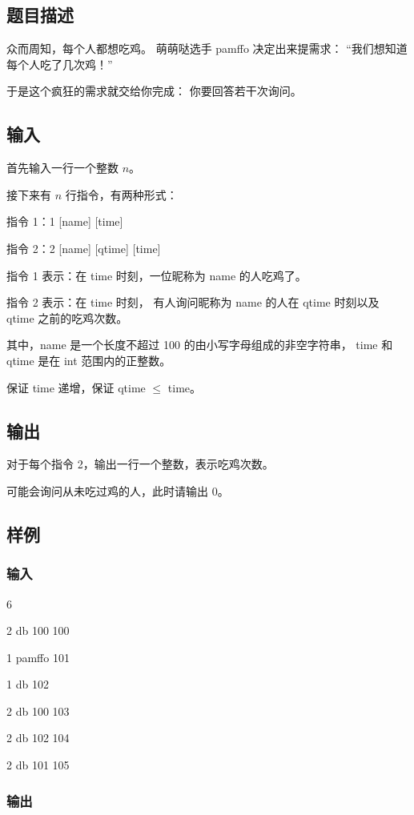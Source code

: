 \documentclass[UTF8]{article}
\begin{document}
	\subsection{题目描述}
	众而周知，每个人都想吃鸡。
	萌萌哒选手 pamffo 决定出来提需求：
	“我们想知道每个人吃了几次鸡！”

	于是这个疯狂的需求就交给你完成：
	你要回答若干次询问。

	\subsection{输入}
	首先输入一行一个整数 $n$。

	接下来有 $n$ 行指令，有两种形式：

	\qquad 指令 1：1 [name] [time]

	\qquad 指令 2：2 [name] [qtime] [time]

	指令 1 表示：在 time 时刻，一位昵称为 name 的人吃鸡了。

	指令 2 表示：在 time 时刻，
	有人询问昵称为 name 的人在 qtime 时刻以及 qtime 之前的吃鸡次数。

	\bigskip
	其中，name 是一个长度不超过 100 的由小写字母组成的非空字符串，
	time 和 qtime 是在 int 范围内的正整数。

	保证 time 递增，保证 qtime $\le$ time。

	\subsection{输出}
	对于每个指令 2，输出一行一个整数，表示吃鸡次数。

	可能会询问从未吃过鸡的人，此时请输出 0。

	\subsection{样例}
	
	\subsubsection{输入}

	6

	2 db 100 100

	1 pamffo 101

	1 db 102

	2 db 100 103

	2 db 102 104

	2 db 101 105

	\subsubsection{输出}
\end{document}
